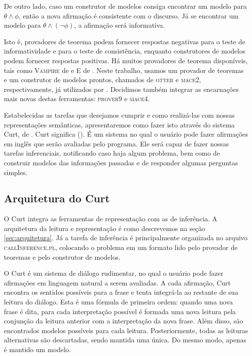 		De outro lado, caso um construtor de modelos consiga encontrar um modelo para $\theta \land \phi$, então a nova afirmação é consistente com o discurso. Já se encontrar um modelo para $\theta \land (\neg \phi)$, a afirmação será informativa.
		
		Isto é, provadores de teorema podem fornecer respostas negativas para o teste de informatividade e para o teste de consistência, enquanto construtores de modelos podem fornecer respostas positivas. Há muitos provadores de teorema disponíveis, tais como \textsc{Vampire} de \citet{vampire} e \textsc{E} de \citet{e-prover}. Neste trabalho, usamos um provador de teoremas e um construtor de modelos prontos, chamados de \textsc{otter} e \textsc{mace2}, respectivamente, já utilizados por \citet{BlackburnBos:2005}. Decidimos também integrar as encarnações mais novas destas ferramentas: \textsc{prover9} e \textsc{mace4}. \citep{prover9-mace4}
	
	Estabelecidas as tarefas que desejamos cumprir e como realizá-las com nossas representações semânticas, apresentaremos como fazer isto através do sistema Curt, de \citet{BlackburnBos:2005}. Curt significa  (). É um sistema no qual o usuário pode fazer afirmações em inglês que serão avaliadas pelo programa. Ele será capaz de fazer nossas tarefas inferenciais, notificando caso haja algum problema, bem como de construir modelos das informações passadas e de responder algumas perguntas simples.

\subsection{Arquitetura do Curt}

	O Curt integra as ferramentas de representação com as de inferência. A arquitetura da leitura e representação é como descrevemos na seção \ref{sec:arquitetura}. Já a tarefa de inferência é principalmente organizada no arquivo \textsc{callInference.pl}, colocando o problema em um formato lido pelo provador de teoremas e pelo construtor de modelos.
	

	O Curt é um sistema de diálogo rudimentar, no qual o usuário pode fazer afirmações em linguagem natural a serem avaliadas. A cada afirmação, Curt encontra os sentidos possíveis para a frase e tenta integrá-la ao restante de sua leitura do diálogo. Esta é uma fórmula de primeira ordem: quando uma nova frase é dita, para cada interpretação possível é formada uma nova leitura pela conjunção da leitura anterior com a interpretação da nova frase. Além disso, são encontrados modelos possíveis para cada leitura. Posteriormente, todas as leituras alternativas são descartadas, sendo mantida uma única. Do mesmo modo, apenas é mantido um modelo.
	
